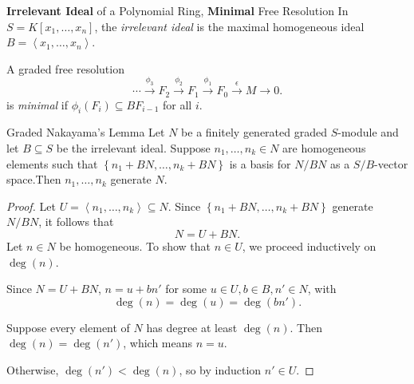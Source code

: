 \documentclass[co439]{subfiles}
\begin{document}
    \rruleline
    
    \begin{definition}{\textbf{Irrelevant Ideal} of a Polynomial Ring, \textbf{Minimal} Free Resolution}
        In $S=K\left[ x_1,\ldots,x_n \right]$, the \emph{irrelevant ideal} is the maximal homogeneous ideal $B=\left< x_1,\ldots,x_n \right>$. 

        A graded free resolution 
        \begin{equation*}
            \cdots \overset{\phi_3}{\to} F_2 \overset{\phi_2}{\to} F_1 \overset{\phi_1}{\to} F_0 \overset{\epsilon}{\to} M\to 0.
        \end{equation*}
        is \emph{minimal} if $\phi_i\left( F_i \right) \subseteq BF_{i-1}$ for all $i$.
    \end{definition}

    \begin{lemma}{Graded Nakayama's Lemma}
        Let $N$ be a finitely generated graded $S$-module and let $B\subseteq S$ be the irrelevant ideal. Suppose $n_1,\ldots,n_k\in N$ are homogeneous elements such that $\left\lbrace n_1+BN,\ldots,n_k+BN \right\rbrace$ is a basis for $N /BN$ as a $S /B$-vector space.\footnotemark[1] Then $n_1,\ldots,n_k$ generate $N$.
        
        \noindent
        \begin{minipage}{\textwidth}
        \end{minipage}
    \end{lemma}

    \begin{proof}
        Let $U = \left< n_1,\ldots,n_k \right>\subseteq N$. Since $\left\lbrace n_1+BN,\ldots,n_k+BN \right\rbrace$ generate $N /BN$, it follows that
        \begin{equation*}
            N = U+BN.
        \end{equation*}
        Let $n\in N$ be homogeneous. To show that $n\in U$, we proceed inductively on $\deg\left( n \right)$.

        Since $N=U+BN$, $n = u+bn'$ for some $u\in U,b\in B, n'\in N$, with
        \begin{equation*}
            \deg\left( n \right) = \deg\left( u \right) = \deg\left( bn' \right).
        \end{equation*}

        Suppose every element of $N$ has degree at least $\deg\left( n \right)$. Then $\deg\left( n \right) = \deg\left( n' \right)$, which means $n=u$. 

        Otherwise, $\deg\left( n' \right)<\deg\left( n \right)$, so by induction $n'\in U$.
    \end{proof}
\end{document}
